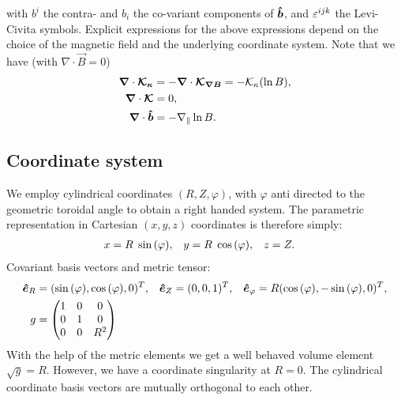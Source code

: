 with $b^i$ the contra- and $b_i$ the co-variant components of $\bm{\hat{b}}$, and 
$\varepsilon^{ijk}$ the Levi-Civita symbols.
Explicit expressions for the above expressions
depend on the choice of the magnetic field and the underlying coordinate system.
    Note that we have (with $\nabla\cdot \vec B  =0$)
\begin{align}
    {\boldsymbol{\nabla}} \cdot {\boldsymbol{\mathcal K_\kappa}}
    &= -{\boldsymbol{\nabla}} \cdot {\boldsymbol{\mathcal K_{\nabla B}}} = -\mathcal K_\kappa(\ln B), \\
    {\boldsymbol{\nabla}}\cdot{\boldsymbol{ \mathcal K}} &= 0, \\
    {\boldsymbol{\nabla}}\cdot \bm{\hat{b}} &= - \nabla_\parallel \ln B  . 
\end{align}
\subsection{Coordinate system}\label{sec:cylmetric}
We employ cylindrical coordinates \( (R,Z,\varphi) \), with \(\varphi\) anti directed to the geometric toroidal angle to
obtain a right handed system. The parametric representation in Cartesian \((x,y,z)\) coordinates is therefore simply:
\begin{align}
 x &= R \hspace{1 mm} \sin{(\varphi)}, &
 y &= R \hspace{1 mm} \cos{(\varphi)}, &
 z &= Z .
\end{align}
Covariant
basis vectors and metric tensor:
\begin{align}
 \bm{\hat{e}}_R      &= (\sin{(\varphi)} ,   \cos{(\varphi)},0)^T, &
 \bm{\hat{e}}_Z      &= ( 0 ,0 ,1 )^T, &
 \bm{\hat{e}}_{\varphi} &= R ( \cos{(\varphi)} , -\sin{(\varphi)} , 0 )^T,
\\
 g &= \begin{pmatrix}
  1 & 0 & 0 \\
  0 & 1 & 0 \\
  0 & 0 & R^2
   \end{pmatrix}
\end{align}
With the help of the metric elements we get a well behaved volume element \(\sqrt{g} = R\). However, we have a coordinate singularity at \(R=0\).
The cylindrical coordinate basis vectors are mutually orthogonal to each other.
